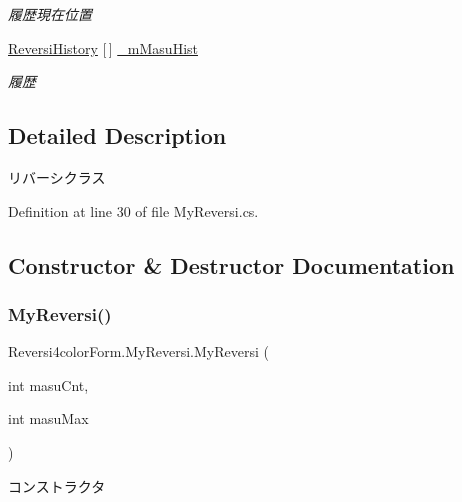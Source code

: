 \begin{DoxyCompactItemize}
\begin{DoxyCompactList}\small\item\em 履歴現在位置 \end{DoxyCompactList}\item 
\mbox{\label{class_reversi4color_form_1_1_my_reversi_a9cfaf615d66481bb1959074d429da2b6}} 
\hyperlink{class_reversi4color_form_1_1_reversi_history}{Reversi\+History} \mbox{[}$\,$\mbox{]} \hyperlink{class_reversi4color_form_1_1_my_reversi_a9cfaf615d66481bb1959074d429da2b6}{\+\_\+m\+Masu\+Hist}
\begin{DoxyCompactList}\small\item\em 履歴 \end{DoxyCompactList}\end{DoxyCompactItemize}


\subsection{Detailed Description}
リバーシクラス 

Definition at line 30 of file My\+Reversi.\+cs.



\subsection{Constructor \& Destructor Documentation}
\mbox{\label{class_reversi4color_form_1_1_my_reversi_af58387f6a43abefc531e9098cdb5e08d}} 
\subsubsection{\texorpdfstring{My\+Reversi()}{MyReversi()}}
{\footnotesize\ttfamily Reversi4color\+Form.\+My\+Reversi.\+My\+Reversi (\begin{DoxyParamCaption}\item[{int}]{masu\+Cnt,  }\item[{int}]{masu\+Max }\end{DoxyParamCaption})}



コンストラクタ 


